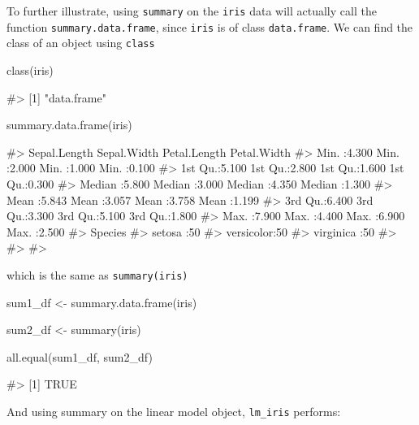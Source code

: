 To further illustrate, using \texttt{summary} on the \texttt{iris} data
will actually call the function \texttt{summary.data.frame}, since
\texttt{iris} is of class \texttt{data.frame}. We can find the class of
an object using \texttt{class}

\begin{Schunk}
\begin{Sinput}
class(iris)
\end{Sinput}
\begin{Soutput}
#> [1] "data.frame"
\end{Soutput}
\end{Schunk}

\begin{Schunk}
\begin{Sinput}
summary.data.frame(iris)
\end{Sinput}
\begin{Soutput}
#>   Sepal.Length    Sepal.Width     Petal.Length    Petal.Width   
#>  Min.   :4.300   Min.   :2.000   Min.   :1.000   Min.   :0.100  
#>  1st Qu.:5.100   1st Qu.:2.800   1st Qu.:1.600   1st Qu.:0.300  
#>  Median :5.800   Median :3.000   Median :4.350   Median :1.300  
#>  Mean   :5.843   Mean   :3.057   Mean   :3.758   Mean   :1.199  
#>  3rd Qu.:6.400   3rd Qu.:3.300   3rd Qu.:5.100   3rd Qu.:1.800  
#>  Max.   :7.900   Max.   :4.400   Max.   :6.900   Max.   :2.500  
#>        Species  
#>  setosa    :50  
#>  versicolor:50  
#>  virginica :50  
#>                 
#>                 
#> 
\end{Soutput}
\end{Schunk}

which is the same as \texttt{summary(iris)}

\begin{Schunk}
\begin{Sinput}
sum1_df <- summary.data.frame(iris)

sum2_df <- summary(iris)

all.equal(sum1_df, sum2_df)
\end{Sinput}
\begin{Soutput}
#> [1] TRUE
\end{Soutput}
\end{Schunk}

And using summary on the linear model object, \texttt{lm\_iris}
performs:

